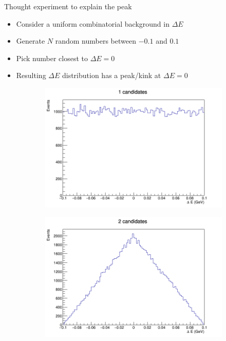 \documentclass{beamer}
\begin{document}
\begin{frame}{Thought experiment to explain the peak}
  \begin{itemize}
    \item{Consider a uniform combinatorial background in $\Delta E$}
    \item{Generate $N$ random numbers between $-0.1$ and $0.1$}
    \item{Pick number closest to $\Delta E = 0$}
    \item{Resulting $\Delta E$ distribution has a peak/kink at $\Delta E = 0$}
  \end{itemize}
  \begin{figure}
    \centering
    \begin{subfigure}{0.33\textwidth}
      \centering
      \includegraphics[width=\textwidth]{DeltaEPeaking1.png}
    \end{subfigure}%
    \begin{subfigure}{0.33\textwidth}
      \centering
      \includegraphics[width=\textwidth]{DeltaEPeaking2.png}

\end{subfigure}
\end{figure}
\end{frame}
\end{document}

